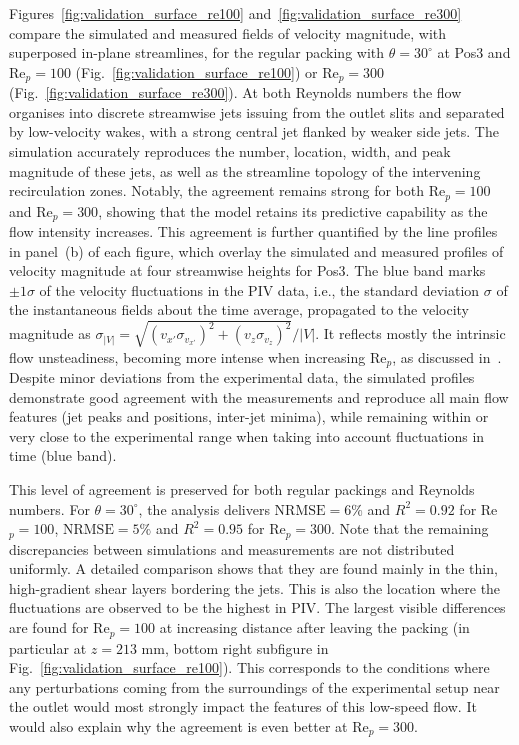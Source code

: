 Figures~\ref{fig:validation_surface_re100} and~\ref{fig:validation_surface_re300} compare the simulated and measured fields of velocity magnitude, with superposed in-plane streamlines, for the regular packing with $\theta=30^\circ$ at Pos3 and Re$_p=100$ (Fig.~\ref{fig:validation_surface_re100}) or Re$_p=300$ (Fig.~\ref{fig:validation_surface_re300}). At both Reynolds numbers the flow organises into discrete streamwise jets issuing from the outlet slits and separated by low-velocity wakes, with a strong central jet flanked by weaker side jets. The simulation accurately reproduces the number, location, width, and peak magnitude of these jets, as well as the streamline topology of the intervening recirculation zones. Notably, the agreement remains strong for both Re$_p=100$ and Re$_p=300$, showing that the model retains its predictive capability as the flow intensity increases. This agreement is further quantified by the line profiles in panel~(b) of each figure, which overlay the simulated and measured profiles of velocity magnitude at four streamwise heights for Pos3. The blue band marks $\pm1\sigma$ of the velocity fluctuations in the PIV data, i.e., the standard deviation $\sigma$ of the instantaneous fields about the time average, propagated to the velocity magnitude as $\sigma_{|V|}=\sqrt{(v_{x'}\sigma_{v_{x'}})^2+(v_z\sigma_{v_z})^2}/|V|$. It reflects mostly the intrinsic flow unsteadiness, becoming more intense when increasing Re$_p$, as discussed in~\cite{velten2026b}. Despite minor deviations from the experimental data, the simulated profiles demonstrate good agreement with the measurements and reproduce all main flow features (jet peaks and positions, inter-jet minima), while remaining within or very close to the experimental range when taking into account fluctuations in time (blue band).

This level of agreement is preserved for both regular packings and Reynolds numbers. For $\theta=30^\circ$, the analysis delivers $\mathrm{NRMSE}=6\%$ and $R^2=0.92$ for Re$_p=100$, $\mathrm{NRMSE}=5\%$ and $R^2=0.95$ for Re$_p=300$. Note that the remaining discrepancies between simulations and measurements are not distributed uniformly. A detailed comparison shows that they are found mainly in the thin, high-gradient shear layers bordering the jets. This is also the location where the fluctuations are observed to be the highest in PIV. The largest visible differences are found for Re$_p=100$ at increasing distance after leaving the packing (in particular at $z=213$ mm, bottom right subfigure in Fig.~\ref{fig:validation_surface_re100}). This corresponds to the conditions where any perturbations coming from the surroundings of the experimental setup near the outlet would most strongly impact the features of this low-speed flow. It would also explain why the agreement is even better at Re$_p=300$.

